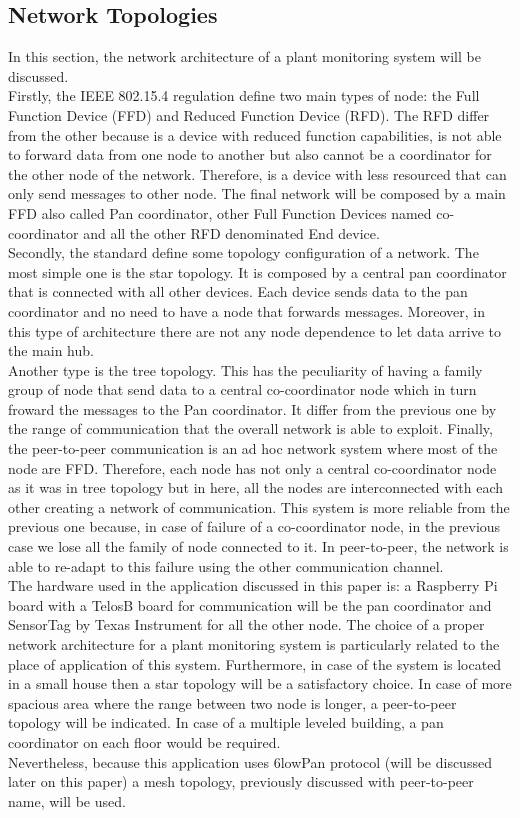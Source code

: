 \subsection{Network Topologies}
In this section, the network architecture of a plant monitoring system will be discussed. \\
Firstly, the IEEE 802.15.4 regulation define two main types of node: the Full Function Device (FFD) and Reduced Function Device (RFD). The RFD differ from the other because is a device with reduced function capabilities, is not able to forward data from one node to another but also cannot be a coordinator for the other node of the network. Therefore, is a device with less resourced that can only send messages to other node. The final network will be composed by a main FFD also called Pan coordinator, other Full Function Devices named co-coordinator and all the other RFD denominated End device. \cite{802154} \\
Secondly, the standard define some topology configuration of a network. The most simple one is the star topology. It is composed by a central pan coordinator that is connected with all other devices. Each device sends data to the pan coordinator and no need to have a node that forwards messages. Moreover, in this type of architecture there are not any node dependence to let data arrive to the main hub.\\
Another type is the tree topology. This has the peculiarity of having a family group of node that send data to a central co-coordinator node which in turn froward the messages to the Pan coordinator. It differ from the previous one by the range of communication that the overall network is able to exploit.
Finally, the peer-to-peer communication is an ad hoc network system where most of the node are FFD. Therefore, each node has not only a central co-coordinator node as it was in tree topology but in here, all the nodes are interconnected with each other creating a network of communication. This system is more reliable from the previous one because, in case of failure of a co-coordinator node, in the previous case we lose all the family of node connected to it. In peer-to-peer, the network is able to re-adapt to this failure using the other communication channel. \cite{slide}\\
The hardware used in the application discussed in this paper is: a Raspberry Pi board with a TelosB board for communication will be the pan coordinator and SensorTag by Texas Instrument for all the other node. The choice of a proper network architecture for a plant monitoring system is particularly related to the place of application of this system. Furthermore, in case of the system is located in a small house then a star topology will be a satisfactory choice. In case of more spacious area where the range between two node is longer, a peer-to-peer topology will be indicated. In case of a multiple leveled building, a pan coordinator on each floor would be required.\\
Nevertheless, because this application uses 6lowPan protocol (will be discussed later on this paper) a mesh topology, previously discussed with peer-to-peer name, will be used.
\\

